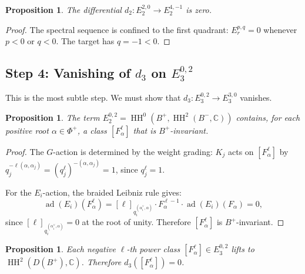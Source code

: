 \documentclass[11pt,letterpaper]{amsart}
\theoremstyle{plain}
\newtheorem{proposition}[theorem]{Proposition}
\theoremstyle{definition}
\theoremstyle{remark}
\newcommand{\HH}{\operatorname{HH}}
\newcommand{\ad}{\operatorname{ad}}
\newcommand{\CC}{\mathbb{C}}
\newcommand{\bplus}{B^{+}}
\newcommand{\bminus}{B^{-}}
\begin{document}
\begin{proposition}
The differential $d_2 \colon E_2^{2,0} \to E_2^{4,-1}$ is zero.
\end{proposition}

\begin{proof}
The spectral sequence is confined to the first quadrant: $E_r^{p,q} = 0$ whenever $p < 0$ or $q < 0$. The target has $q = -1 < 0$.
\end{proof}

\subsection{Step 4: Vanishing of $d_3$ on $E_3^{0,2}$}

This is the most subtle step. We must show that $d_3 \colon E_3^{0,2} \to E_3^{3,0}$ vanishes.

\begin{proposition}
\label{prop:binv}
The term $E_2^{0,2} = \HH^0(\bplus, \HH^2(\bminus, \CC))$ contains, for each positive root $\alpha \in \Phi^+$, a class $[F_\alpha^\ell]$ that is $\bplus$-invariant.
\end{proposition}

\begin{proof}
The $G$-action is determined by the weight grading: $K_j$ acts on $[F_\alpha^\ell]$ by $q_j^{-\ell(\alpha, \alpha_j)} = (q_j^\ell)^{-(\alpha, \alpha_j)} = 1$, since $q_j^\ell = 1$.

For the $E_i$-action, the braided Leibniz rule gives:
\[
\ad(E_i)(F_\alpha^\ell) = [\ell]_{q_i^{(\alpha_i^\vee, \alpha)}} \cdot F_\alpha^{\ell-1} \cdot \ad(E_i)(F_\alpha) = 0,
\]
since $[\ell]_{q_i^{(\alpha_i^\vee, \alpha)}} = 0$ at the root of unity. Therefore $[F_\alpha^\ell]$ is $\bplus$-invariant.
\end{proof}

\begin{proposition}
\label{prop:d3}
Each negative $\ell$-th power class $[F_\alpha^\ell] \in E_3^{0,2}$ lifts to $\HH^2(D(\bplus), \CC)$. Therefore $d_3([F_\alpha^\ell]) = 0$.
\end{proposition}
\end{document}
